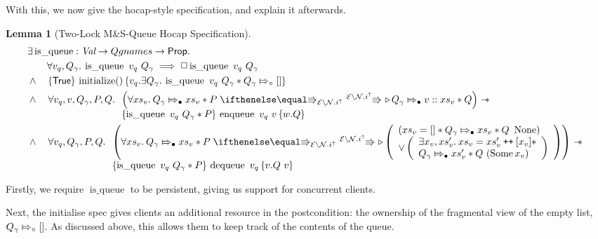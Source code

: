 \documentclass[twoside,11pt,openright]{report}
\newtheorem{lemma}[theorem]{Lemma}
\newcommand{\initialise}{\operatorname{initialize}}
\newcommand{\enqueue}{\operatorname{enqueue}}
\newcommand{\dequeue}{\operatorname{dequeue}}
\newcommand{\isqueue}{\operatorname{is\_queue}}
\newcommand{\Qg}{Q_\gname}
\newcommand\catenate{\mathbin{\text{\ttfamily\upshape ++}}}
\newcommand{\Nl}{\ensuremath{\mathcal{N}}}
\newcommand{\abstractstatefullfrag}[2]{#1 \Mapsto_{\circ} #2}
\newcommand{\abstractstateauth}[2]{#1 \Mapsto_{\bullet} #2}
\begin{document}
With this, we now give the hocap-style specification, and explain it afterwards.
\begin{lemma}[Two-Lock M\&S-Queue Hocap Specification]\label{TLMSQ:spec:hocap}
\begin{align*}
  &\Exists \isqueue : \Val \to Qgnames \to \Prop.\\
  &\quad\quad \All v_q, Q_\gname . \isqueue \ v_q \ Q_\gname \implies \persistently \isqueue \ v_q \ Q_\gname\\
  &\land\quad\hoare{\TRUE}{\initialise \TT}{v_q . \Exists Q_\gname . \isqueue\ v_q \ Q_\gname \star \abstractstatefullfrag{\Qg}{[]} }\\
  &\land\quad \All v_q, v, Q_\gname, P, Q.
    \begin{array}[t]{l}
    \left(\All xs_v . \abstractstateauth{\Qg}{xs_v} \star P \vs[\mask\setminus\Nl.i^\uparrow] \later \abstractstateauth{\Qg}{v :: xs_v} \star Q \right)
    \wand\\
    \hoare{\isqueue \ v_q \ Q_\gname \star P}{\enqueue\ v_q\ v}{w . Q}
    \end{array}\\
  &\land\quad \All v_q, Q_\gname, P, Q.
    \begin{array}[t]{l}
    \left(\All xs_v . \abstractstateauth{\Qg}{xs_v} \star P \vs[\mask\setminus\Nl.i^\uparrow] \later
      \left(
        \begin{array}{l}
          (xs_v = [] \star \abstractstateauth{\Qg}{xs_v} \star Q \ \None)\\
          \lor
          \left(
            \begin{array}{l}
              \Exists x_v, xs_v' . xs_v = xs_v' \catenate [x_v] \star\\
              \abstractstateauth{\Qg}{xs_v'} \star Q \ (\Some{x_v})
            \end{array}
            \right)
        \end{array}
      \right) \right)
    \wand\\
    \hoare{\isqueue \ v_q \ Q_\gname \star P}{\dequeue\ v_q}{v . Q\ v}
    \end{array}
\end{align*}
\end{lemma}
Firstly, we require $\isqueue$ to be persistent, giving us support for concurrent clients.

Next, the initialise spec gives clients an additional resource in the postcondition: the ownership of the fragmental view of the empty list, $\abstractstatefullfrag{\Qg}{[]}$. As discussed above, this allows them to keep track of the contents of the queue.
\end{document}
